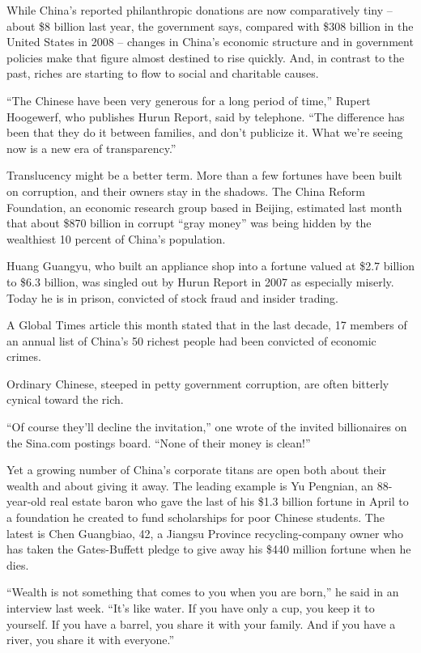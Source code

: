 ﻿\documentclass[12pt]{article}
\begin{document}
While China's reported philanthropic donations are now comparatively tiny -- about \$8 billion last
year, the government says, compared with \$308 billion in the United States in 2008 -- changes in
China's economic structure and in government policies make that figure almost destined to rise
quickly. And, in contrast to the past, riches are starting to flow to social and charitable causes.

``The Chinese have been very generous for a long period of time,'' Rupert Hoogewerf, who publishes
Hurun Report, said by telephone. ``The difference has been that they do it between families, and
don't publicize it. What we're seeing now is a new era of transparency.''

Translucency might be a better term. More than a few fortunes have been built on corruption, and
their owners stay in the shadows. The China Reform Foundation, an economic research group based in
Beijing, estimated last month that about \$870 billion in corrupt ``gray money'' was being hidden by
the wealthiest 10 percent of China's population.

Huang Guangyu, who built an appliance shop into a fortune valued at \$2.7 billion to \$6.3 billion,
was singled out by Hurun Report in 2007 as especially miserly. Today he is in prison, convicted of
stock fraud and insider trading.

A Global Times article this month stated that in the last decade, 17 members of an annual list of
China's 50 richest people had been convicted of economic crimes.

Ordinary Chinese, steeped in petty government corruption, are often bitterly cynical toward the
rich.

``Of course they'll decline the invitation,'' one wrote of the invited billionaires on the Sina.com
postings board. ``None of their money is clean!''

Yet a growing number of China's corporate titans are open both about their wealth and about giving
it away. The leading example is Yu Pengnian, an 88-year-old real estate baron who gave the last of
his \$1.3 billion fortune in April to a foundation he created to fund scholarships for poor Chinese
students. The latest is Chen Guangbiao, 42, a Jiangsu Province recycling-company owner who has taken
the Gates-Buffett pledge to give away his \$440 million fortune when he dies.

``Wealth is not something that comes to you when you are born,'' he said in an interview last week.
``It's like water. If you have only a cup, you keep it to yourself. If you have a barrel, you share
it with your family. And if you have a river, you share it with everyone.''
\end{document}
